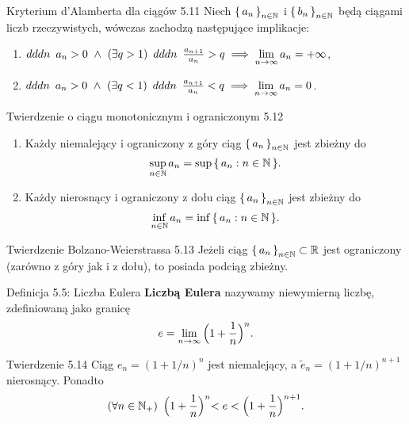 \documentclass{article}
\newcommand{\hquad}{\mkern9mu}
\newcommand{\R}{\mathbb{R}}
\newcommand{\N}{\mathbb{N}}
\newcommand{\lin}[1]{\lim\limits_{n\to\infty}{#1}}
\newcommand{\seq}[1]{\set{#1_n}_{n\in\N}}
\begin{document}
\begin{twier}{Kryterium d'Alamberta dla ciągów 5.11}
Niech $\seq{a}$ i $\seq{b}$ będą ciągami liczb rzeczywistych, wówczas zachodzą następujące implikacje:
\begin{enumerate}[label=\Roman*.]
    \item $dddn\hquad a_n>0\ \land\ (\exists q>1)\hquad dddn\hquad \frac{a_{n+1}}{a_n}>q\implies \lin{a_n}=+\infty$,
    \item $dddn\hquad a_n>0\ \land\ (\exists q<1)\hquad dddn\hquad \frac{a_{n+1}}{a_n}<q\implies \lin{a_n}=0$.
\end{enumerate}
\end{twier}

\smallskip

\begin{twier}{Twierdzenie o ciągu monotonicznym i ograniczonym 5.12}
\begin{enumerate}[label=\Roman*.]
    \item Każdy niemalejący i ograniczony z góry ciąg $\seq{a}$ jest zbieżny do
    \[\sup\limits_{n\in\N}{a_n}=\sup{\set{a_n:n\in\N}}.\]
    \item Każdy nierosnący i ograniczony z dołu ciąg $\seq{a}$ jest zbieżny do
    \[\inf\limits_{n\in\N}{a_n}=\inf{\set{a_n:n\in\N}}.\]
\end{enumerate}
\end{twier}

\begin{twier}{Twierdzenie Bolzano-Weierstrassa 5.13}
Jeżeli ciąg $\seq{a}\subset \R$ jest ograniczony (zarówno z góry jak i z dołu), to posiada podciąg zbieżny.
\end{twier}

\begin{defr}{Definicja 5.5: Liczba Eulera}
    \textbf{Liczbą Eulera} nazywamy niewymierną liczbę, zdefiniowaną jako granicę 
    \begin{equation*}
        e=\lin{\Bigl(1+\frac{1}{n}\Bigl)^n}.
    \end{equation*}
\end{defr}

\begin{twier}{Twierdzenie 5.14}
Ciąg $e_n=(1+ 1/n)^n$ jest niemalejący, a $\tilde{e}_n=(1+1/n)^{n+1}$ nierosnący. Ponadto
\begin{equation*}
    (\forall n\in\N_+)\hquad \Bigl(1+\frac{1}{n}\Bigl)^n < e < \Bigl(1+\frac{1}{n}\Bigl)^{n+1}.
\end{equation*}
\end{twier}
\end{document}
